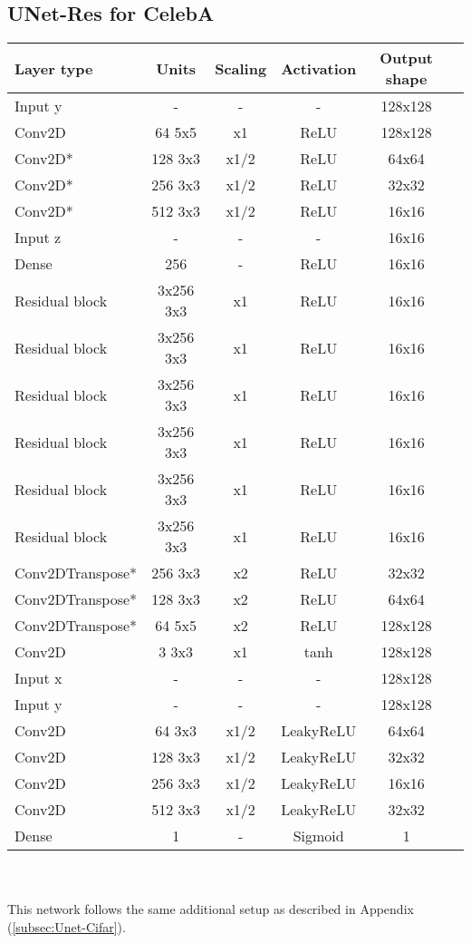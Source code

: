 {\subsection{UNet-Res for CelebA}
\label{subsec:unet_celeba}
{
	\centering
	\begin{tabular}{|l|c|c|c|c|c|}
		\hline
		Layer type & Units & Scaling & Activation & Output shape\\
		\hline
		Input y & - & - & - & 128x128\\
		Conv2D & 64 5x5 & x1 & ReLU & 128x128 \\
		Conv2D* & 128 3x3 & x1/2 & ReLU & 64x64 \\
		Conv2D* & 256 3x3 & x1/2 & ReLU & 32x32 \\
		Conv2D* & 512 3x3 & x1/2 & ReLU & 16x16 \\
		Input z & - & - & - & 16x16\\
		Dense & 256 & - & ReLU & 16x16\\
		Residual block & 3x256 3x3 & x1 & ReLU & 16x16 \\
		Residual block & 3x256 3x3 & x1 & ReLU & 16x16 \\
		Residual block & 3x256 3x3 & x1 & ReLU & 16x16 \\
		Residual block & 3x256 3x3 & x1 & ReLU & 16x16 \\
		Residual block & 3x256 3x3 & x1 & ReLU & 16x16 \\
		Residual block & 3x256 3x3 & x1 & ReLU & 16x16 \\
		Conv2DTranspose* & 256 3x3 & x2 & ReLU & 32x32 \\
		Conv2DTranspose* & 128 3x3 & x2 & ReLU & 64x64 \\
		Conv2DTranspose* & 64 5x5 & x2 & ReLU & 128x128 \\
		Conv2D & 3 3x3 & x1 & tanh & 128x128 \\
		\hline
		Input x & - & - & - & 128x128\\
		Input y & - & - & - & 128x128\\
		Conv2D & 64 3x3 & x1/2 & LeakyReLU & 64x64 \\
		Conv2D & 128 3x3 & x1/2 & LeakyReLU & 32x32 \\
		Conv2D & 256 3x3 & x1/2 & LeakyReLU & 16x16 \\
		Conv2D & 512 3x3 & x1/2 & LeakyReLU & 32x32 \\
		Dense & 1 & - & Sigmoid & 1\\
		\hline
	\end{tabular}
}\\~\\
\noindent
This network follows the same additional setup as described in Appendix (\ref{subsec:Unet-Cifar}).


}
